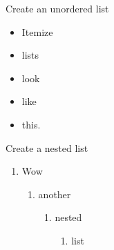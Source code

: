 Create an unordered list 

\begin{itemize}
    \item Itemize
    \item lists
    \item look
    \item like
    \item this.
\end{itemize}

Create a nested list 

\begin{enumerate}
    \item Wow
    \begin{enumerate}
        \item another
        \begin{enumerate}
            \item nested
            \begin{enumerate}
                \item list
            \end{enumerate}
        \end{enumerate}
    \end{enumerate}
\end{enumerate}